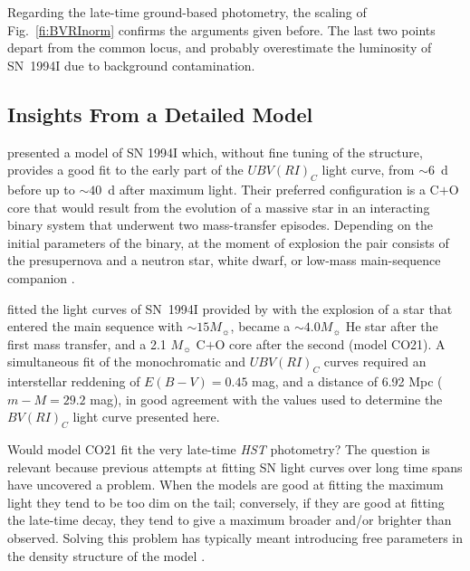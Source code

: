 \documentclass[12pt,manuscript]{aastex}
\begin{document}
Regarding the late-time ground-based photometry, the scaling 
of Fig.~\ref{fi:BVRInorm} confirms the arguments given before.
%
The last two points depart from the common locus, and probably 
overestimate the luminosity of SN~1994I due to background 
contamination.


\subsection{Insights From a Detailed Model}

\citet{ietal94} presented a model of SN 1994I which, without 
fine tuning of the structure, provides a good fit to the early 
part of the $UBV(RI)_C$ light curve, from $\sim 6$~d before up 
to $\sim 40$~d after maximum light.
%
Their preferred configuration is a C$+$O core that would
result from the evolution of a massive star in an interacting binary
system that underwent two mass-transfer episodes.
%
Depending on the initial parameters of the binary, at the moment of 
explosion the pair consists of the presupernova and a neutron 
star, white dwarf, or low-mass main-sequence companion 
\citep{netal94}.


\citet{ietal94} fitted the light curves of SN~1994I provided 
by \citet{schmidt94} with the explosion of a star that entered 
the main sequence with $\sim 15 M_\sun$, became a 
$\sim 4.0 M_\sun$ He star after the first mass transfer,
and a 2.1 $M_\sun$ C$+$O core after the second (model CO21).
%
A simultaneous fit of the monochromatic and $UBV(RI)_C$ curves
required an interstellar reddening of $E(B-V) = 0.45$ mag, and 
a distance of 6.92 Mpc ($m-M = 29.2$ mag), in good agreement 
with the values used to determine the $BV(RI)_C$ light curve 
presented here.


Would model CO21 fit the very late-time {\em HST} photometry?
%
The question is relevant because previous attempts at fitting 
SN light curves over long time spans have uncovered
a problem. When the models are good at fitting the maximum 
light they tend to be too dim on the tail; conversely,
if they are good at fitting the late-time decay, they tend 
to give a maximum broader and/or brighter than observed.
%
Solving this problem has typically meant introducing free 
parameters in the density structure of the model
\citep{eandw88,tetal06}.
\end{document}
